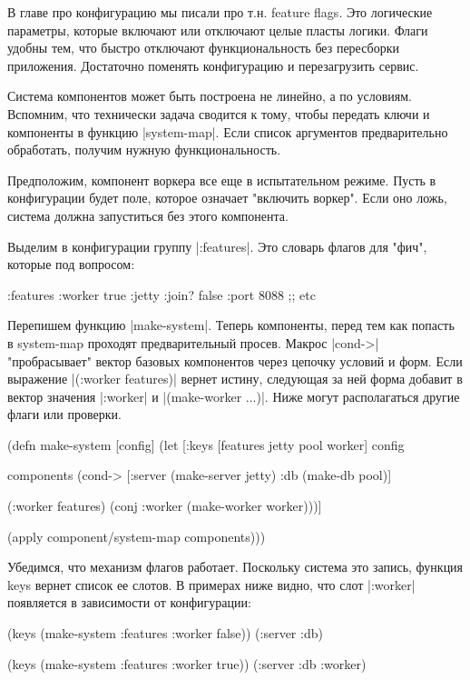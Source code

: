 В главе про конфигурацию мы писали про т.н. feature flags. Это логические
параметры, которые включают или отключают целые пласты логики. Флаги удобны тем,
что быстро отключают функциональность без пересборки приложения. Достаточно
поменять конфигурацию и перезагрузить сервис.

Система компонентов может быть построена не линейно, а по условиям. Вспомним,
что технически задача сводится к тому, чтобы передать ключи и компоненты в
функцию \spverb|system-map|. Если список аргументов предварительно обработать, получим
нужную функциональность.

Предположим, компонент воркера все еще в испытательном режиме. Пусть в
конфигурации будет поле, которое означает "включить воркер". Если оно ложь,
система должна запуститься без этого компонента.

Выделим в конфигурации группу \spverb|:features|. Это словарь флагов для "фич", которые
под вопросом:

\begin{code}
{:features {:worker true}
 :jetty {:join? false :port 8088}
 ;; etc
}
\end{code}

Перепишем функцию \spverb|make-system|. Теперь компоненты, перед тем как попасть в
system-map проходят предварительный просев. Макрос \spverb|cond->| "пробрасывает"
вектор базовых компонентов через цепочку условий и форм. Если выражение
\spverb|(:worker features)| вернет истину, следующая за ней форма добавит в вектор
значения \spverb|:worker| и \spverb|(make-worker {...})|. Ниже могут располагаться другие
флаги или проверки.

\begin{code}
(defn make-system
  [config]
  (let [{:keys [features jetty pool worker]} config

        components
        (cond-> [:server (make-server jetty)
                 :db     (make-db pool)]

          (:worker features)
          (conj :worker (make-worker worker)))]

    (apply component/system-map components)))
\end{code}

Убедимся, что механизм флагов работает. Поскольку система это запись, функция
keys вернет список ее слотов. В примерах ниже видно, что слот \spverb|:worker|
появляется в зависимости от конфигурации:

\begin{code}
(keys (make-system {:features {:worker false}}))
(:server :db)

(keys (make-system {:features {:worker true}}))
(:server :db :worker)
\end{code}

